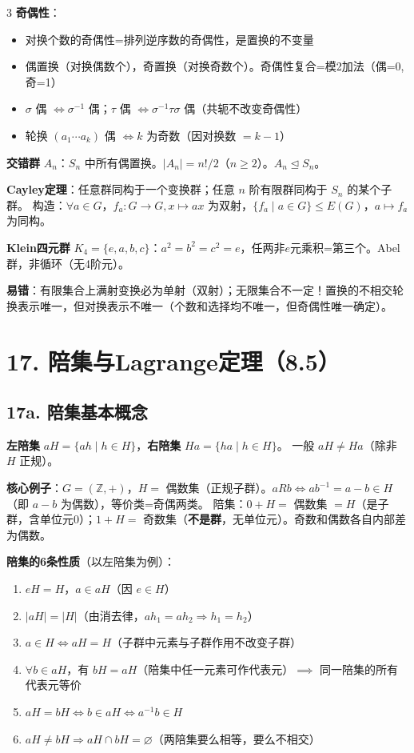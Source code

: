 \documentclass[10pt,a4paper,landscape]{ctexart}
\begin{document}
\begin{multicols}{3}
\textbf{奇偶性}：
\begin{itemize}
\item 对换个数的奇偶性=排列逆序数的奇偶性，是置换的不变量
\item 偶置换（对换偶数个），奇置换（对换奇数个）。奇偶性复合=模2加法（偶=0,奇=1）
\item $\sigma$ 偶 $\iff\sigma^{-1}$ 偶；$\tau$ 偶 $\iff\sigma^{-1}\tau\sigma$ 偶（共轭不改变奇偶性）
\item 轮换 $(a_1\cdots a_k)$ 偶 $\iff k$ 为奇数（因对换数 $=k-1$）
\end{itemize}

\textbf{交错群} $A_n$：$S_n$ 中所有偶置换。$|A_n|=n!/2$（$n\geq 2$）。$A_n\trianglelefteq S_n$。

\textbf{Cayley定理}：任意群同构于一个变换群；任意 $n$ 阶有限群同构于 $S_n$ 的某个子群。
构造：$\forall a\in G$，$f_a:G\to G,x\mapsto ax$ 为双射，$\{f_a\mid a\in G\}\leq E(G)$，$a\mapsto f_a$ 为同构。

\textbf{Klein四元群} $K_4=\{e,a,b,c\}$：$a^2=b^2=c^2=e$，任两非$e$元乘积=第三个。Abel群，非循环（无4阶元）。

\textbf{易错}：有限集合上满射变换必为单射（双射）；无限集合不一定！置换的不相交轮换表示唯一，但对换表示不唯一（个数和选择均不唯一，但奇偶性唯一确定）。

\section*{17. 陪集与Lagrange定理（8.5）}

\subsection*{17a. 陪集基本概念}

\textbf{左陪集} $aH=\{ah\mid h\in H\}$，\textbf{右陪集} $Ha=\{ha\mid h\in H\}$。
一般 $aH\neq Ha$（除非 $H$ 正规）。

\textbf{核心例子}：$G=(\mathbb{Z},+)$，$H=$ 偶数集（正规子群）。$aRb\iff ab^{-1}=a-b\in H$（即 $a-b$ 为偶数），等价类=奇偶两类。
陪集：$0+H=$ 偶数集 $=H$（是子群，含单位元0）；$1+H=$ 奇数集（\textbf{不是群}，无单位元）。奇数和偶数各自内部差为偶数。

\textbf{陪集的6条性质}（以左陪集为例）：
\begin{enumerate}[nosep,leftmargin=*]
\item $eH=H$，$a\in aH$（因 $e\in H$）
\item $|aH|=|H|$（由消去律，$ah_1=ah_2\Rightarrow h_1=h_2$）
\item $a\in H\iff aH=H$（子群中元素与子群作用不改变子群）
\item $\forall b\in aH$，有 $bH=aH$（陪集中任一元素可作代表元）$\implies$ 同一陪集的所有代表元等价
\item $aH=bH\iff b\in aH\iff a^{-1}b\in H$
\item $aH\neq bH\Rightarrow aH\cap bH=\varnothing$（两陪集要么相等，要么不相交）
\end{enumerate}


\end{multicols}
\end{document}
